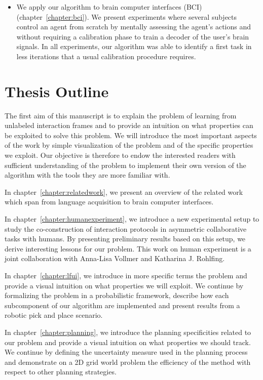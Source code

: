 \begin{itemize}
\item We apply our algorithm to brain computer interfaces (BCI) \cite{grizou2013zero,grizou2014calibration} (chapter~\ref{chapter:bci}). We present experiments where several subjects control an agent from scratch by mentally assessing the agent's actions and without requiring a calibration phase to train a decoder of the user's brain signals. In all experiments, our algorithm was able to identify a first task in less iterations that a usual calibration procedure requires.

\end{itemize}

\section{Thesis Outline}

The first aim of this manuscript is to explain the problem of learning from unlabeled interaction frames and to provide an intuition on what properties can be exploited to solve this problem. We will introduce the most important aspects of the work by simple visualization of the problem and of the specific properties we exploit. Our objective is therefore to endow the interested readers with sufficient understanding of the problem to implement their own version of the algorithm with the tools they are more familiar with.

In chapter~\ref{chapter:relatedwork}, we present an overview of the related work which span from language acquisition to brain computer interfaces.

In chapter~\ref{chapter:humanexperiment}, we introduce a new experimental setup to study the co-construction of interaction protocols in asymmetric collaborative tasks with humans. By presenting preliminary results based on this setup, we derive interesting lessons for our problem. This work on human experiment is a joint collaboration with Anna-Lisa Vollmer and Katharina J. Rohlfing.

In chapter~\ref{chapter:lfui}, we introduce in more specific terms the problem and provide a visual intuition on what properties we will exploit. We continue by formalizing the problem in a probabilistic framework, describe how each subcomponent of our algorithm are implemented and present results from a robotic pick and place scenario.

In chapter~\ref{chapter:planning}, we introduce the planning specificities related to our problem and provide a visual intuition on what properties we should track. We continue by defining the uncertainty measure used in the planning process and demonstrate on a 2D grid world problem the efficiency of the method with respect to other planning strategies.

